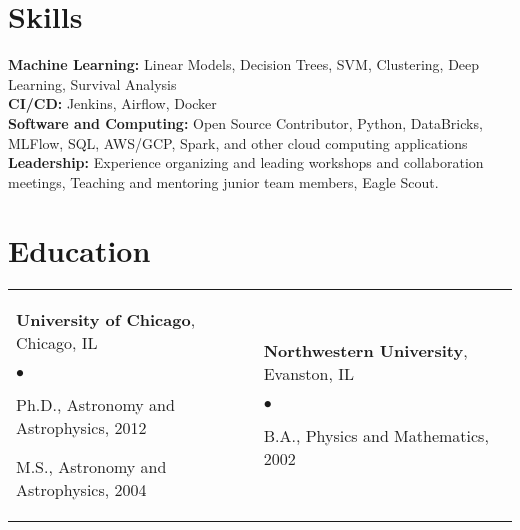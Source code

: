 \documentclass[margin,line, 11pt]{res}
\newenvironment{list2}{
  \begin{list}{$\bullet$}{%
      \setlength{\itemsep}{0in}
      \setlength{\parsep}{0in} \setlength{\parskip}{0in}
      \setlength{\topsep}{0in} \setlength{\partopsep}{0in}
      \setlength{\leftmargin}{0.2in}}}{\end{list}}
\begin{document}
\begin{resume}

\section{Skills}
\textbf{Machine Learning:} Linear Models, Decision Trees, SVM, Clustering, Deep Learning, Survival Analysis\\
\textbf{CI/CD:} Jenkins, Airflow, Docker\\
\textbf{Software and Computing:} Open Source Contributor, Python, DataBricks, MLFlow, SQL, AWS/GCP, Spark, and other cloud computing applications \\
\textbf{Leadership:} Experience organizing and leading workshops and collaboration meetings, Teaching and mentoring junior team members, Eagle Scout. \\
\vspace*{-7mm}

\section{Education}
\begin{tabular}{@{}p{3in}p{3in}}
  \textbf{University of Chicago}, Chicago, IL
  \begin{list2}
  	\item Ph.D., Astronomy and Astrophysics, 2012
    \item M.S., Astronomy and Astrophysics, 2004
  \end{list2} &
  \textbf{Northwestern University}, Evanston, IL
  \begin{list2}
  	\item B.A., Physics and Mathematics, 2002
  \end{list2} \\
\end{tabular}
\vspace*{-4mm}

\end{resume}
\end{document}
